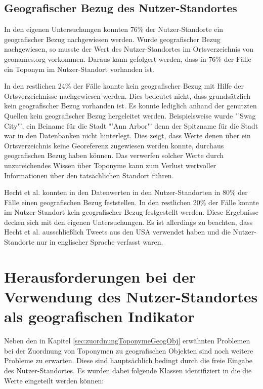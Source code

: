 	

		\subsection{Geografischer Bezug des Nutzer-Standortes} 
			
			In den eigenen Untersuchungen konnten 76\% der Nutzer-Standorte ein geografischer Bezug nachgewiesen werden. 
			Wurde geografischer Bezug nachgewiesen, so musste der Wert des Nutzer-Standortes im Ortsverzeichnis von geonames.org vorkommen. 
			Daraus kann gefolgert werden, dass in 76\% der Fälle ein Toponym im Nutzer-Standort vorhanden ist.
			
			In den restlichen 24\% der Fälle konnte kein geografischer Bezug mit Hilfe der Ortsverzeichnisse nachgewiesen werden. 
			Dies bedeutet nicht, dass grundsätzlich kein geografischer Bezug vorhanden ist. 
			Es konnte lediglich anhand der genutzten Quellen kein geografischer Bezug hergeleitet werden.
			Beispielsweise wurde "'Swag City"', ein Beiname für die Stadt "'Ann Arbor"' denn der Spitzname für die Stadt war in den Datenbanken nicht hinterlegt. 
			Dies zeigt, dass Werte denen über ein Ortsverzeichnis keine Georeferenz zugewiesen werden konnte, durchaus geografischen Bezug haben können.
			Das verwerfen solcher Werte durch unzureichendes Wissen über Toponyme kann zum Verlust wertvoller Informationen über den tatsächlichen Standort führen.

			Hecht et al. konnten in \cite{Hecht2011} den Datenwerten in den Nutzer-Standorten in 80\% der Fälle einen geografischen Bezug feststellen.
			In den restlichen 20\% der Fälle konnte im Nutzer-Standort kein geografischer Bezug festgestellt werden. 
			Diese Ergebnisse decken sich mit den eigenen Untersuchungen. 
			Es ist allerdings zu beachten, dass Hecht et al. ausschließlich Tweets aus den USA verwendet haben und die Nutzer-Standorte nur in englischer Sprache verfasst waren. 
					
	\section{Herausforderungen bei der Verwendung des Nutzer-Standortes als geografischen Indikator} \label{sec:HerausforderungenBeiDerVerwendungDesNutzerStadortes}  

		Neben den in Kapitel \ref{sec:zuordnungToponymeGeogObj} erwähnten Problemen bei der Zuordnung von Toponymen zu geografischen Objekten sind noch weitere Probleme zu erwarten.
		Diese sind hauptsächlich bedingt durch die freie Eingabe des Nutzer-Standortes.
		Es wurden dabei folgende Klassen identifiziert in die die Werte eingeteilt werden können:

